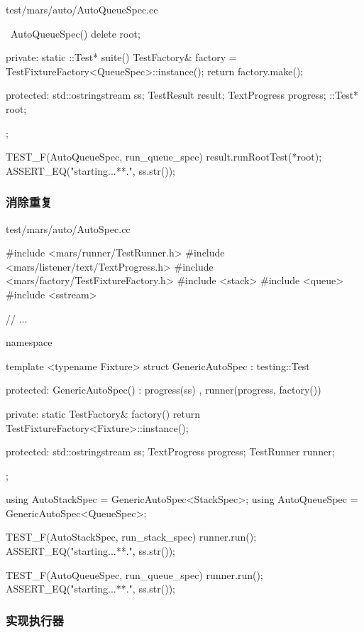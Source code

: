 \begin{content}
\begin{nodiff}{test/mars/auto/AutoQueueSpec.cc}
\begin{c++}
{{    ~AutoQueueSpec() {
      delete root;
    }

  private:
    static ::Test* suite() {
      TestFactory& factory = TestFixtureFactory<QueueSpec>::instance();
      return factory.make();
    }

  protected:
    std::ostringstream ss;
    TestResult result;
    TextProgress progress;
    ::Test* root;
  };
}

TEST_F(AutoQueueSpec, run_queue_spec) {
  result.runRootTest(*root);
  ASSERT_EQ("starting...\n***\nend.\n", ss.str());
}
 \end{c++}
\end{nodiff}

\subsubsection{消除重复}

\begin{nodiff}{test/mars/auto/AutoSpec.cc}
 \begin{c++}
#include <mars/runner/TestRunner.h>
#include <mars/listener/text/TextProgress.h>
#include <mars/factory/TestFixtureFactory.h>
#include <stack>
#include <queue>
#include <sstream>

// ...

namespace {
  template <typename Fixture>
  struct GenericAutoSpec : testing::Test {
  protected:
    GenericAutoSpec()
      : progress(ss)
      , runner(progress, factory()) {}

  private:
    static TestFactory& factory() {
      return TestFixtureFactory<Fixture>::instance();
    }

  protected:
    std::ostringstream ss;
    TextProgress progress;
    TestRunner runner;
  };

  using AutoStackSpec = GenericAutoSpec<StackSpec>;
  using AutoQueueSpec = GenericAutoSpec<QueueSpec>;
}

TEST_F(AutoStackSpec, run_stack_spec) {
  runner.run();
  ASSERT_EQ("starting...\n***\nend.\n", ss.str());
}

TEST_F(AutoQueueSpec, run_queue_spec) {
  runner.run();
  ASSERT_EQ("starting...\n***\nend.\n", ss.str());
}
 \end{c++}
\end{nodiff}

\subsubsection{实现执行器}


\end{content}
